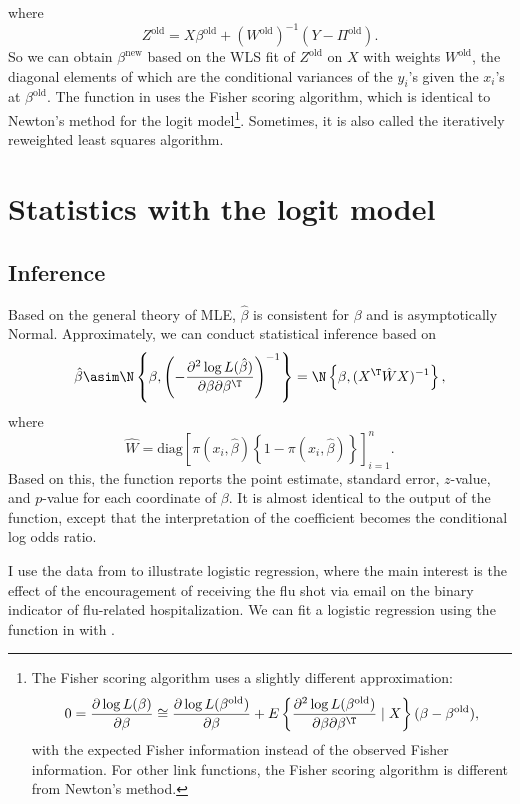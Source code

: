 where
\[
Z^{\text{old}}=X\beta^{\text{old}}+(W^{\text{old}})^{-1}(Y-\Pi^{\text{old}}).
\]
So we can obtain $\beta^{\text{new}}$ based on the WLS
fit of $Z^{\text{old}}$ on $X$ with weights $W^{\text{old}}$, the diagonal elements of which
are the conditional variances of the $y_{i}$'s given the $x_{i}$'s at $\beta^{\text{old}}$.
The  function in  uses the Fisher scoring algorithm, which is
identical to Newton's method for the logit model\footnote{The Fisher scoring algorithm uses a slightly different approximation:
$$
0=\frac{\partial\log L( \beta )}{\partial\beta}\cong\frac{\partial\log L(\beta^{\text{old}})}{\partial\beta}
+  E\left\{ \frac{\partial^{2}\log L(\beta^{\text{old}})}{\partial\beta\partial\beta^{\T}}  \mid X \right\} (\beta-\beta^{\text{old}}) ,
$$ 
with the expected Fisher information instead of the observed Fisher information. For other link functions, the Fisher scoring algorithm is different from Newton's method. 
}. Sometimes, it is
also called the iteratively reweighted least squares algorithm. 



\section{Statistics with the logit model}





\subsection{Inference}

Based on the general theory of MLE, $\hat{\beta}$ is consistent for
$\beta$ and is asymptotically Normal. Approximately, we can conduct
statistical inference based on
\[
\hat{\beta}\asim \N\left\{ \beta,\left(-\frac{\partial^{2}\log L(\hat{\beta})}{\partial\beta\partial\beta^{\T}}\right)^{-1}\right\} 
=\N\left\{ \beta, (X^{\T}\hat{W}X)^{-1} \right\},
\]
where 
\[
\hat{W}=\text{diag}\left[\pi(x_{i},\hat{\beta})\left\{ 1-\pi(x_{i},\hat{\beta} )\right\} \right]_{i=1}^{n}.
\]
Based on this, the  function reports the point estimate, standard error, $z$-value, and $p$-value for each coordinate of $\beta$. It is almost identical to the output of the  function, except that the interpretation of the coefficient becomes the conditional log odds ratio. 



I use the data from \citet{hirano2000assessing} to illustrate logistic regression, where the main interest is the effect of the encouragement of receiving the flu shot via email on the binary indicator of flu-related hospitalization. We can fit a logistic regression using the  function in  with . 

